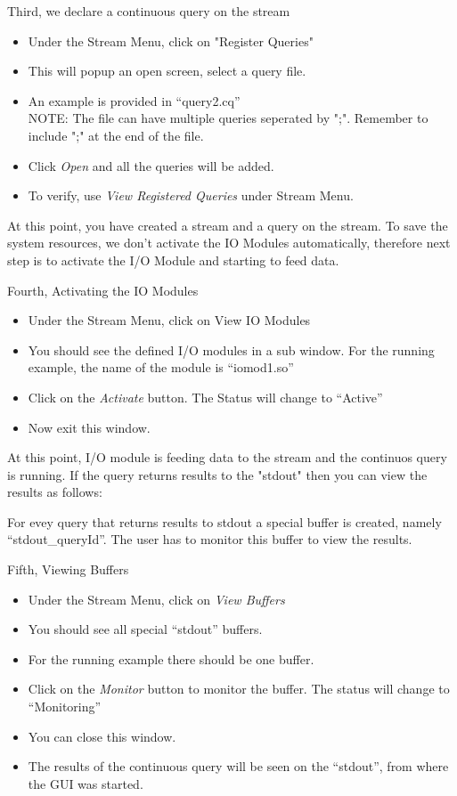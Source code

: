 \documentclass[10pt]{report}
\begin{document}
Third, we declare a continuous query on the stream
\begin{itemize}
  \item Under the Stream Menu, click on "Register Queries"
  \item This will popup an open screen, select a query file.
  \item An example is provided in ``query2.cq''\\
    NOTE: The file can have multiple queries seperated by ";". Remember
to include ";" at the end of the file.
  \item Click {\em Open} and all the queries will be added.
  \item To verify, use {\em View Registered Queries} under Stream Menu.
\end{itemize}

At this point, you have created a stream and a query on the stream. To
save the system resources, we don't activate the IO Modules automatically,
therefore next step is to activate the I/O Module and starting to feed data.

Fourth, Activating the IO Modules
\begin{itemize}
  \item Under the Stream Menu, click on {View IO Modules}
  \item You should see the defined I/O modules in a sub window. For the running
example, the name of the module is ``iomod1.so''
  \item Click on the {\em Activate} button. The Status will change to ``Active''
  \item Now exit this window.

\end{itemize}
At this point, I/O module is feeding data to the stream and the continuos
query is running. If the query returns results to the "stdout" then you
can view the results as follows:

For evey query that returns results to stdout a special buffer is created,
namely ``stdout\_queryId''. The user has to monitor this buffer to view the
results.

Fifth, Viewing Buffers
\begin{itemize}
  \item Under the Stream Menu, click on {\em View Buffers}
  \item You should see all special ``stdout'' buffers.
  \item For the running example there should be one buffer.
  \item Click on the {\em Monitor} button to monitor the buffer. The status will
change to ``Monitoring''
  \item You can close this window.
  \item The results of the continuous query will be seen on the ``stdout'', from
where the GUI was started.
\end{itemize}
\end{document}

